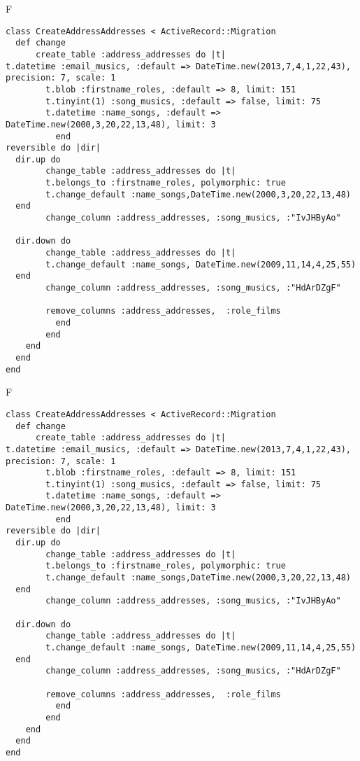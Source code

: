 F
\begin{verbatim}
class CreateAddressAddresses < ActiveRecord::Migration
  def change
	  create_table :address_addresses do |t|
t.datetime :email_musics, :default => DateTime.new(2013,7,4,1,22,43), precision: 7, scale: 1
		t.blob :firstname_roles, :default => 8, limit: 151
		t.tinyint(1) :song_musics, :default => false, limit: 75
		t.datetime :name_songs, :default => DateTime.new(2000,3,20,22,13,48), limit: 3
		  end
reversible do |dir|
  dir.up do
		change_table :address_addresses do |t|
		t.belongs_to :firstname_roles, polymorphic: true
 		t.change_default :name_songs,DateTime.new(2000,3,20,22,13,48)
  end
 		change_column :address_addresses, :song_musics, :"IvJHByAo"
   
  dir.down do
		change_table :address_addresses do |t|
		t.change_default :name_songs, DateTime.new(2009,11,14,4,25,55)
  end
 		change_column :address_addresses, :song_musics, :"HdArDZgF"
   
		remove_columns :address_addresses,  :role_films 
	      end
	    end
    end 
  end
end

\end{verbatim}

F
\begin{verbatim}
class CreateAddressAddresses < ActiveRecord::Migration
  def change
	  create_table :address_addresses do |t|
t.datetime :email_musics, :default => DateTime.new(2013,7,4,1,22,43), precision: 7, scale: 1
		t.blob :firstname_roles, :default => 8, limit: 151
		t.tinyint(1) :song_musics, :default => false, limit: 75
		t.datetime :name_songs, :default => DateTime.new(2000,3,20,22,13,48), limit: 3
		  end
reversible do |dir|
  dir.up do
		change_table :address_addresses do |t|
		t.belongs_to :firstname_roles, polymorphic: true
 		t.change_default :name_songs,DateTime.new(2000,3,20,22,13,48)
  end
 		change_column :address_addresses, :song_musics, :"IvJHByAo"
   
  dir.down do
		change_table :address_addresses do |t|
		t.change_default :name_songs, DateTime.new(2009,11,14,4,25,55)
  end
 		change_column :address_addresses, :song_musics, :"HdArDZgF"
   
		remove_columns :address_addresses,  :role_films 
	      end
	    end
    end 
  end
end

\end{verbatim}

